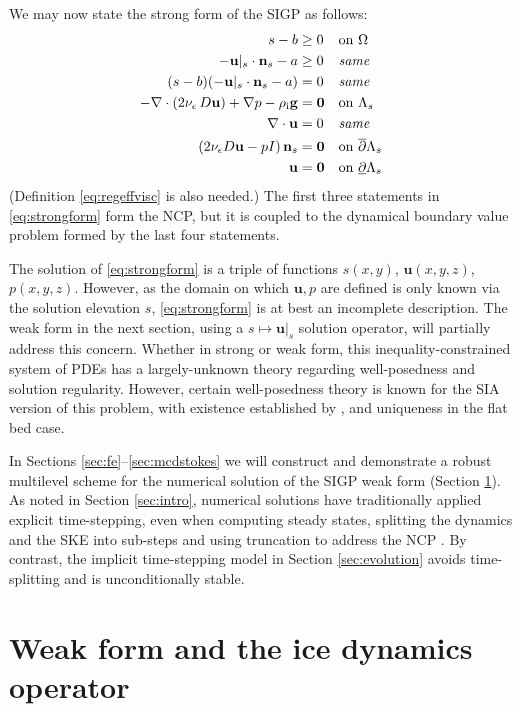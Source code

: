 \documentclass[letterpaper,final,12pt,reqno]{amsart}
\theoremstyle{claim}
\newcommand{\eps}{\epsilon}
\newcommand{\bn}{\mathbf{n}}
\newcommand{\bu}{\mathbf{u}}
\newcommand{\bzero}{\bm{0}}
\newcommand{\rhoi}{\rho_{\text{i}}}
\numberwithin{equation}{section}
\numberwithin{figure}{section}
\numberwithin{table}{section}
\numberwithin{theorem}{section}
\begin{document}
We may now state the strong form of the SIGP as follows:
\begin{align}
s - b &\ge 0 && \text{on $\Omega$} \label{eq:strongform} \\
- \bu|_s \cdot \bn_s - a &\ge 0 && \text{\emph{same}} \notag \\
(s - b) (- \bu|_s \cdot \bn_s - a) &= 0 && \text{\emph{same}} \notag \\
- \nabla \cdot \left(2 \nu_\eps\, D\bu\right) + \nabla p - \rhoi \mathbf{g} &= \bzero && \text{on $\Lambda_s$} \notag \\
\nabla \cdot \bu &= 0 && \text{\emph{same}} \notag \\
\left(2 \nu_\eps D\bu - pI\right) \bn_s &= \bzero && \text{on $\overline{\partial} \Lambda_s$} \notag \\
\bu &= \bzero && \text{on $\underline{\partial} \Lambda_s$} \notag
\end{align}
(Definition \eqref{eq:regeffvisc} is also needed.)  The first three statements in \eqref{eq:strongform} form the NCP, but it is coupled to the dynamical boundary value problem formed by the last four statements.

The solution of \eqref{eq:strongform} is a triple of functions $s(x,y)$, $\bu(x,y,z)$, $p(x,y,z)$.  However, as the domain on which $\bu,p$ are defined is only known via the solution elevation $s$, \eqref{eq:strongform} is at best an incomplete description.  The weak form in the next section, using a $s\mapsto \bu|_s$ solution operator, will partially address this concern.  Whether in strong or weak form, this inequality-constrained system of PDEs has a largely-unknown theory regarding well-posedness and solution regularity.  However, certain well-posedness theory is known for the SIA version of this problem, with existence established by \cite{JouvetBueler2012}, and uniqueness in the flat bed case.

In Sections \ref{sec:fe}--\ref{sec:mcdstokes} we will construct and demonstrate a robust multilevel scheme for the numerical solution of the SIGP weak form (Section \ref{sec:weakido}).  As noted in Section \ref{sec:intro}, numerical solutions have traditionally applied explicit time-stepping, even when computing steady states, splitting the dynamics and the SKE into sub-steps and using truncation to address the NCP \cite[for example]{Jouvetetal2008,Lengetal2012}.  By contrast, the implicit time-stepping model in Section \ref{sec:evolution} avoids time-splitting and is unconditionally stable.


\section{Weak form and the ice dynamics operator} \label{sec:weakido}
\end{document}
